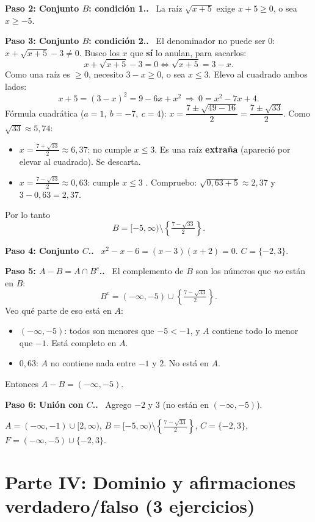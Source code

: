 \documentclass[11pt,a4paper]{article}
\newcommand{\paso}[1]{\par\medskip\noindent\textbf{\textcolor{blue!50!black}{Paso #1.}}\ }
\begin{document}
\paso{2: Conjunto $B$: condición 1.} La raíz $\sqrt{x+5}$ exige $x+5\ge0$, o sea $x\ge-5$.

\paso{3: Conjunto $B$: condición 2.} El denominador no puede ser $0$: $x+\sqrt{x+5}-3\ne0$.
Busco los $x$ que \textbf{sí} lo anulan, para sacarlos:
\[ x+\sqrt{x+5}-3=0\iff\sqrt{x+5}=3-x. \]
Como una raíz es $\ge0$, necesito $3-x\ge0$, o sea $x\le3$. Elevo al cuadrado ambos lados:
\[ x+5=(3-x)^2=9-6x+x^2\ \Rightarrow\ 0=x^2-7x+4. \]
Fórmula cuadrática ($a=1,\ b=-7,\ c=4$): $x=\dfrac{7\pm\sqrt{49-16}}2=\dfrac{7\pm\sqrt{33}}2$.
Como $\sqrt{33}\approx5{,}74$:
\begin{itemize}[nosep]
  \item $x=\frac{7+\sqrt{33}}2\approx6{,}37$: no cumple $x\le3$. Es una raíz \textbf{extraña} (apareció por elevar al cuadrado). Se descarta.
  \item $x=\frac{7-\sqrt{33}}2\approx0{,}63$: cumple $x\le3$ \checkmark. Compruebo: $\sqrt{0{,}63+5}\approx2{,}37$ y $3-0{,}63=2{,}37$.
\end{itemize}
Por lo tanto
\[ B=[-5,\infty)\setminus\left\{\tfrac{7-\sqrt{33}}2\right\}. \]

\paso{4: Conjunto $C$.} $x^2-x-6=(x-3)(x+2)=0$. $C=\{-2,3\}$.

\paso{5: $A-B=A\cap B^c$.} El complemento de $B$ son los números que \emph{no} están en $B$:
\[ B^c=(-\infty,-5)\cup\left\{\tfrac{7-\sqrt{33}}2\right\}. \]
Veo qué parte de eso está en $A$:
\begin{itemize}[nosep]
  \item $(-\infty,-5)$: todos son menores que $-5<-1$, y $A$ contiene todo lo menor que $-1$. Está completo en $A$.
  \item $0{,}63$: $A$ no contiene nada entre $-1$ y $2$. No está en $A$.
\end{itemize}
Entonces $A-B=(-\infty,-5)$.

\paso{6: Unión con $C$.} Agrego $-2$ y $3$ (no están en $(-\infty,-5)$).
\begin{respuesta}
$A=(-\infty,-1)\cup[2,\infty)$, \quad $B=[-5,\infty)\setminus\left\{\frac{7-\sqrt{33}}2\right\}$, \quad $C=\{-2,3\}$,\\[0.3em]
$F=(-\infty,-5)\cup\{-2,3\}.$
\end{respuesta}

\newpage
\section{Parte IV: Dominio y afirmaciones verdadero/falso (3 ejercicios)}
\end{document}

